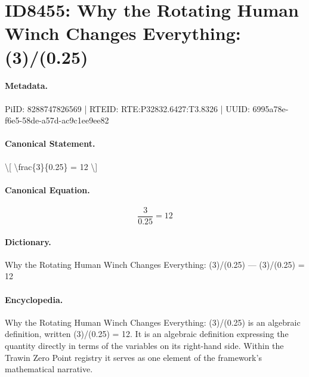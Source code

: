 \section*{ID8455: Why the Rotating Human Winch Changes Everything: (3)/(0.25)}
\paragraph{Metadata.}
PiID: 8288747826569 | RTEID: RTE:P32832.6427:T3.8326 | UUID: 6995a78e-f6e5-58de-a57d-ac9c1ee9ee82

\paragraph{Canonical Statement.}
\textbackslash{}[ \textbackslash{}frac\{3\}\{0.25\} = 12 \textbackslash{}]

\paragraph{Canonical Equation.}
\[
\frac{3}{0.25} = 12
\]

\paragraph{Dictionary.}
Why the Rotating Human Winch Changes Everything: (3)/(0.25) — (3)/(0.25) = 12

\paragraph{Encyclopedia.}
Why the Rotating Human Winch Changes Everything: (3)/(0.25) is an algebraic definition, written (3)/(0.25) = 12. It is an algebraic definition expressing the quantity directly in terms of the variables on its right-hand side. Within the Trawin Zero Point registry it serves as one element of the framework's mathematical narrative.
